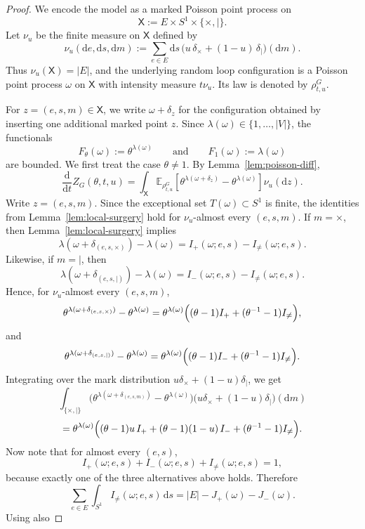 \documentclass[10pt,a4paper]{amsart}
\newcommand{\Ebb}{\mathbb{E}}
\newcommand{\dd}{\mathrm{d}}
\begin{document}
\begin{proof}
We encode the model as a marked Poisson point process on
\[
\mathsf X:=E\times S^1\times\{\times,\mid\}.
\]
Let \(\nu_u\) be the finite measure on \(\mathsf X\) defined by
\[
\nu_u(\dd e,\dd s,\dd m)
:=
\sum_{e\in E}\dd s\,
\bigl(u\,\delta_{\times}+(1-u)\,\delta_{\mid}\bigr)(\dd m).
\]
Thus \(\nu_u(\mathsf X)=|E|\), and the underlying random loop configuration is a
Poisson point process \(\omega\) on \(\mathsf X\) with intensity measure \(t\nu_u\).
Its law is denoted by \(\rho_{t,u}^G\).

For \(z=(e,s,m)\in\mathsf X\), we write \(\omega+\delta_z\) for the configuration
obtained by inserting one additional marked point \(z\). Since
\(\lambda(\omega)\in\{1,\dots,|V|\}\), the functionals
\[
F_\theta(\omega):=\theta^{\lambda(\omega)}
\qquad\text{and}\qquad
F_1(\omega):=\lambda(\omega)
\]
are bounded.
We first treat the case \(\theta\neq 1\). By Lemma~\ref{lem:poisson-diff},
\[
\frac{\dd}{\dd t}Z_G(\theta,t,u)
=
\int_{\mathsf X}
\Ebb_{\rho_{t,u}^G}\!\left[
\theta^{\lambda(\omega+\delta_z)}-\theta^{\lambda(\omega)}
\right]\nu_u(\dd z).
\]
Write \(z=(e,s,m)\). Since the exceptional set \(T(\omega)\subset S^1\) is finite,
the identities from Lemma~\ref{lem:local-surgery} hold for \(\nu_u\)-almost every
\((e,s,m)\).
If \(m=\times\), then Lemma~\ref{lem:local-surgery} implies
\[
\lambda(\omega+\delta_{(e,s,\times)})-\lambda(\omega)
=
I_+(\omega;e,s)-I_{\neq}(\omega;e,s).
\]
Likewise, if \(m=\mid\), then
\[
\lambda(\omega+\delta_{(e,s,\mid)})-\lambda(\omega)
=
I_-(\omega;e,s)-I_{\neq}(\omega;e,s).
\]
Hence, for \(\nu_u\)-almost every \((e,s,m)\),
\[
\theta^{\lambda(\omega+\delta_{(e,s,\times)})}-\theta^{\lambda(\omega)}
=
\theta^{\lambda(\omega)}
\Bigl((\theta-1)I_+ + (\theta^{-1}-1)I_{\neq}\Bigr),
\]
and
\[
\theta^{\lambda(\omega+\delta_{(e,s,\mid)})}-\theta^{\lambda(\omega)}
=
\theta^{\lambda(\omega)}
\Bigl((\theta-1)I_- + (\theta^{-1}-1)I_{\neq}\Bigr).
\]
Integrating over the mark distribution
\(u\delta_\times+(1-u)\delta_{\mid}\), we get
\[
\int_{\{\times,\mid\}}
\bigl(\theta^{\lambda(\omega+\delta_{(e,s,m)})}-\theta^{\lambda(\omega)}\bigr)
\bigl(u\delta_\times+(1-u)\delta_{\mid}\bigr)(\dd m)
\]
\[
=
\theta^{\lambda(\omega)}
\Bigl(
(\theta-1)u\,I_+ + (\theta-1)(1-u)\,I_- + (\theta^{-1}-1)I_{\neq}
\Bigr).
\]
Now note that for almost every \((e,s)\),
\[
I_+(\omega;e,s)+I_-(\omega;e,s)+I_{\neq}(\omega;e,s)=1,
\]
because exactly one of the three alternatives above holds. Therefore
\[
\sum_{e\in E}\int_{S^1} I_{\neq}(\omega;e,s)\,\dd s
=
|E|-J_+(\omega)-J_-(\omega).
\]
Using also

\end{proof}
\end{document}
